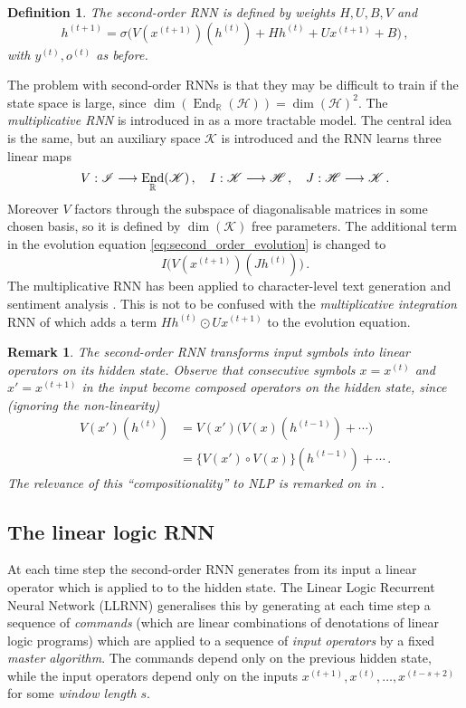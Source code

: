 \documentclass[english,letter paper,12pt,leqno]{article}
\theoremstyle{example}
\newtheorem{definition}[theorem]{Definition}
\newtheorem{remark}[theorem]{Remark}
\numberwithin{equation}{section}
\def\be{\begin{equation}}
\def\ee{\end{equation}}
\DeclareMathOperator{\End}{End}
\begin{document}
\begin{definition} The second-order RNN \cite{highorderrec,pollack} is defined by weights $H,U,B,V$ and
\be\label{eq:second_order_evolution}
h^{(t+1)} = \sigma\big( V( x^{(t+1)} )(h^{(t)}) + H h^{(t)} + U x^{(t+1)} + B\big)\,,
\ee 
with $y^{(t)}, o^{(t)}$ as before.
\end{definition}

The problem with second-order RNNs is that they may be difficult to train if the state space is large, since $\dim(\End_{\mathbb{R}}(\mathscr{H})) = \dim(\mathscr{H})^2$. The \emph{multiplicative RNN} is introduced in \cite{sutskever} as a more tractable model. The central idea is the same, but an auxiliary space $\mathscr{K}$ is introduced and the RNN learns three linear maps
\be\label{eq:threelinearmaps}
V: \mathscr{I} \lto \End_{\mathbb{R}}(\mathscr{K})\,, \quad I: \mathscr{K} \lto \mathscr{H}\,, \quad J: \mathscr{H} \lto \mathscr{K}\,.
\ee
Moreover $V$ factors through the subspace of diagonalisable matrices in some chosen basis, so it is defined by $\dim(\mathscr{K})$ free parameters. The additional term in the evolution equation \eqref{eq:second_order_evolution} is changed to
\be\label{eq:new_term_mRNN}
I\big( V(x^{(t+1)})( J h^{(t)} ) \big)\,.
\ee
The multiplicative RNN has been applied to character-level text generation \cite{sutskever} and sentiment analysis \cite{irsoy}. This is not to be confused with the \emph{multiplicative integration} RNN of \cite{yuhai} which adds a term $H h^{(t)} \odot U x^{(t+1)}$ to the evolution equation.

\begin{remark}
The second-order RNN transforms input symbols into linear operators on its hidden state. Observe that consecutive symbols $x = x^{(t)}$ and $x' = x^{(t+1)}$ in the input become composed operators on the hidden state, since (ignoring the non-linearity)
\begin{align*}
V(x')(h^{(t)}) &= V(x')\big( V(x)(h^{(t-1)}) + \cdots)\\
&= \big\{ V(x') \circ V(x) \big\}( h^{(t-1)} ) + \cdots\,.
\end{align*}
The relevance of this ``compositionality'' to NLP is remarked on in \cite{irsoy}.
\end{remark}


\subsection{The linear logic RNN}

At each time step the second-order RNN generates from its input a linear operator which is applied to to the hidden state. The Linear Logic Recurrent Neural Network (LLRNN) generalises this by generating at each time step a sequence of \emph{commands} (which are linear combinations of denotations of linear logic programs) which are applied to a sequence of \emph{input operators} by a fixed \emph{master algorithm}. The commands depend only on the previous hidden state, while the input operators depend only on the inputs $x^{(t+1)}, x^{(t)}, \ldots, x^{(t-s+2)}$ for some \emph{window length} $s$.
\end{document}
